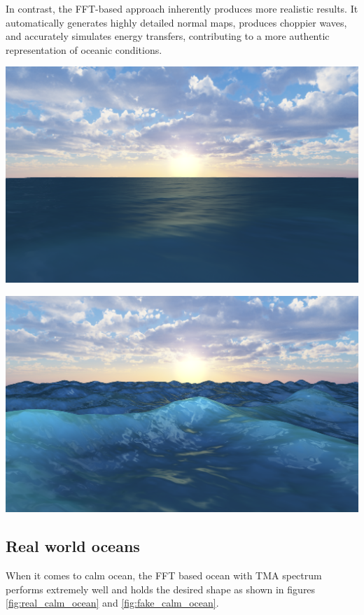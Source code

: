 In contrast, the FFT-based approach inherently produces more realistic results. It automatically generates highly detailed normal maps, produces choppier waves, and accurately simulates energy transfers, contributing to a more authentic representation of oceanic conditions.

\begin{minipage}{0.48\textwidth}
    \centering
    \includegraphics[width=1\textwidth]{"images/naive_calm.png"}
    \label{fig:naive_calm}
\end{minipage}
\hfill
\begin{minipage}{0.48\textwidth}
    \centering
    \includegraphics[width=1\textwidth]{"images/naive_storm.png"}
    \label{fig:naive_stormy}
\end{minipage}

\subsection{Real world oceans}
When it comes to calm ocean, the FFT based ocean with TMA spectrum performs extremely well and holds the desired shape as shown in figures \ref{fig:real_calm_ocean} and \ref{fig:fake_calm_ocean}.

